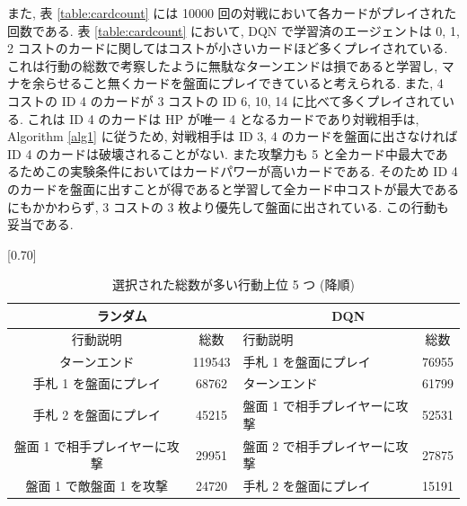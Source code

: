 \documentclass[twocolumn]{jarticle}
\begin{document}
  また,  表 \ref{table:cardcount} には 10000 回の対戦において各カードがプレイされた回数である. 表 \ref{table:cardcount} において, DQN で学習済のエージェントは 0, 1, 2 コストのカードに関してはコストが小さいカードほど多くプレイされている. これは行動の総数で考察したように無駄なターンエンドは損であると学習し, マナを余らせること無くカードを盤面にプレイできていると考えられる. 
  また, 4 コストの ID 4 のカードが 3 コストの ID 6, 10, 14 に比べて多くプレイされている. これは ID 4 のカードは HP が唯一 4 となるカードであり対戦相手は, Algorithm \ref{alg1} に従うため, 対戦相手は ID 3, 4 のカードを盤面に出さなければ ID 4 のカードは破壊されることがない. また攻撃力も 5 と全カード中最大であるためこの実験条件においてはカードパワーが高いカードである. そのため ID 4 のカードを盤面に出すことが得であると学習して全カード中コストが最大であるにもかかわらず, 3 コストの 3 枚より優先して盤面に出されている. この行動も妥当である.

  \begin{table}[t]
    \centering
    \caption{選択された総数が多い行動上位 5 つ (降順)}
    \vspace{-0.3cm}
    \label{table:actioncount}
    \scalebox{0.68}[0.70]{
      \begin{tabular}{|cc|cc|}
        \hline
        \multicolumn{2}{|c|}{ランダム}      & \multicolumn{2}{c|}{DQN}       \\ \hline
        \multicolumn{1}{|c|}{行動説明} & 総数 & \multicolumn{1}{l|}{行動説明} & 総数 \\ \hline \hline
        \multicolumn{1}{|c|}{ターンエンド}    & 119543  & \multicolumn{1}{l|}{手札 1 を盤面にプレイ}    & 76955  \\ \hline
        \multicolumn{1}{|c|}{手札 1 を盤面にプレイ}    & 68762  & \multicolumn{1}{l|}{ターンエンド}    & 61799  \\ \hline
        \multicolumn{1}{|c|}{手札 2 を盤面にプレイ}    & 45215  & \multicolumn{1}{l|}{盤面 1 で相手プレイヤーに攻撃}    & 52531  \\ \hline
        \multicolumn{1}{|c|}{盤面 1 で相手プレイヤーに攻撃}    & 29951  & \multicolumn{1}{l|}{盤面 2 で相手プレイヤーに攻撃}    & 27875  \\ \hline
        \multicolumn{1}{|c|}{盤面 1 で敵盤面 1 を攻撃}    & 24720  & \multicolumn{1}{l|}{手札 2 を盤面にプレイ}    & 15191  \\ \hline
        \end{tabular}
    }
  \end{table}
\end{document}
